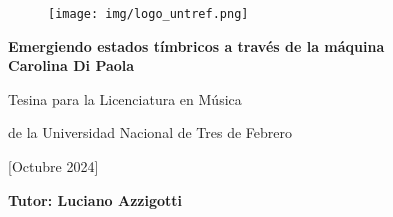 \begin{titlepage}

 	\begin{center}
 			\begin{figure}[h]
 			\texttt{[image: img/logo\_untref.png]}
 			\end{figure}
		{\LARGE \textbf {Emergiendo estados tímbricos a través de la máquina}}\\
		
		{\large \textbf {Carolina Di Paola}}
		
		\vspace{15cm}
		
		{\Large Tesina para la Licenciatura en Música}
		
		{\Large de la Universidad Nacional de Tres de Febrero}
		
 		{\Large [Octubre 2024]}
 		
 		{\Large \textbf{Tutor: Luciano Azzigotti}}
 		
	\end{center}
\end{titlepage}
 